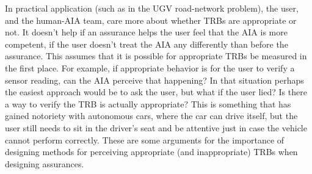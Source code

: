     In practical application (such as in the UGV road-network problem), the user, and the human-AIA team, care more about whether TRBs are appropriate or not. It doesn't help if an assurance helps the user feel that the AIA is more competent, if the user doesn't treat the AIA any differently than before the assurance. This assumes that it is possible for appropriate TRBs be measured in the first place. For example, if appropriate behavior is for the user to verify a sensor reading, can the AIA perceive that happening? In that situation perhaps the easiest approach would be to ask the user, but what if the user lied? Is there a way to verify the TRB is actually appropriate? This is something that has gained notoriety with autonomous cars, where the car can drive itself, but the user still needs to sit in the driver's seat and be attentive just in case the vehicle cannot perform correctly. These are some arguments for the importance of designing methods for perceiving appropriate (and inappropriate) TRBs when designing assurances. 
%
%
%
